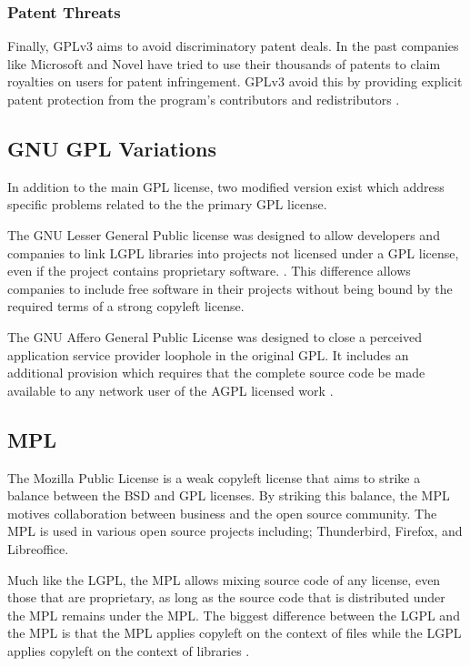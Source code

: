 \documentclass[12pt,letterpaper]{article}
\begin{document}
\subsubsection{Patent Threats}

Finally, GPLv3 aims to avoid discriminatory patent deals. In the past companies like Microsoft and Novel have tried to use their thousands of patents to claim royalties on users for patent infringement. GPLv3 avoid this by providing explicit patent protection from the program's contributors and redistributors \cite{gpl3}.

\newpage

\subsection{GNU GPL Variations}

In addition to the main GPL license, two modified version exist which address specific problems related to the the primary GPL license.

The GNU Lesser General Public license was designed to allow developers and companies to link LGPL libraries into projects not licensed under a GPL license, even if the project contains proprietary software. \cite{lgpl}. This difference allows companies to include free software in their projects without being bound by the required terms of a strong copyleft license.

The GNU Affero General Public License was designed to close a perceived application service provider loophole in the original GPL. It includes an additional provision which requires that the complete source code be made available to any network user of the AGPL licensed work \cite{agpl}.

\subsection{MPL}

The Mozilla Public License is a weak copyleft license that aims to strike a balance between the BSD and GPL licenses. By striking this balance, the MPL motives collaboration between business and the open source community. The MPL is used in various open source projects including; Thunderbird, Firefox, and Libreoffice.

Much like the LGPL, the MPL allows mixing source code of any license, even those that are proprietary, as long as the source code that is distributed under the MPL remains under the MPL. The biggest difference between the LGPL and the MPL is that the MPL applies copyleft on the context of files while the LGPL applies copyleft on the context of libraries \cite{mpl}.
\end{document}
